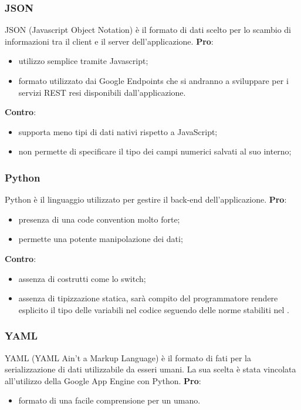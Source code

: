 		\subsubsection{JSON} %
		\label{ssub:json}
		JSON (Javascript Object Notation) è il formato di dati scelto per lo scambio di informazioni tra il client e il server dell'applicazione. \newline
		\textbf{Pro}:
			\begin{itemize}
				\item utilizzo semplice tramite Javascript;
				\item formato utilizzato dai Google Endpoints che si andranno a sviluppare per i servizi REST resi disponibili dall'applicazione. 
			\end{itemize}
			\noindent
			\textbf{Contro}:
			\begin{itemize}
				\item supporta meno tipi di dati nativi rispetto a JavaScript;
				\item non permette di specificare il tipo dei campi numerici salvati al suo interno;
			\end{itemize}
		\noindent

		\subsubsection{Python} %
		\label{sub:python}
		Python è il linguaggio utilizzato per gestire il back-end dell'applicazione. \newline
		\textbf{Pro}:
			\begin{itemize}
				\item presenza di una code convention molto forte;
				\item permette una potente manipolazione dei dati;
			\end{itemize}
		\noindent
		\newline
		\textbf{Contro}:
			\begin{itemize}
				\item assenza di costrutti come lo switch;
				\item assenza di tipizzazione statica, sarà compito del programmatore rendere esplicito il tipo delle variabili nel codice seguendo delle norme stabiliti nel \docNameVersionNdP.
			\end{itemize}
		\noindent

		\subsubsection{YAML} %
		\label{ssub:yaml}
		YAML (YAML Ain't a Markup Language) è il formato di fati per la serializzazione di dati utilizzabile da esseri umani. \newline
		La sua scelta è stata vincolata all'utilizzo della Google App Engine con Python. \newline
		\textbf{Pro}:
			\begin{itemize}
				\item formato di una facile comprensione per un umano.
			\end{itemize}
		\noindent

